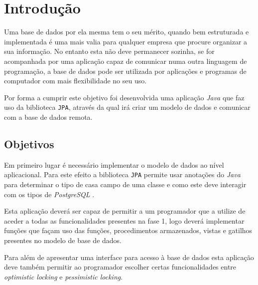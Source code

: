 %
%
\chapter{Introdução} \label{cap1}

Uma base de dados por ela mesma tem o seu mérito, quando bem estruturada e implementada é uma mais valia para qualquer empresa que procure organizar a sua informação. No entanto
esta não deve permanecer sozinha, se for acompanhada por uma aplicação capaz de comunicar numa outra linguagem de programação, a base de dados pode ser utilizada por aplicações
e programas de computador com mais flexibilidade no seu uso.

Por forma a cumprir este objetivo foi desenvolvida uma aplicação \textit{Java} que faz uso da biblioteca \texttt{JPA}, através da qual irá criar um modelo de dados e comunicar
com a base de dados remota.

%
%
\section{Objetivos} \label{sec11}

Em primeiro lugar é necessário implementar o modelo de dados ao nível aplicacional. Para este efeito a biblioteca \texttt{JPA} permite usar anotações do \textit{Java} para determinar
o tipo de casa campo de uma classe e como este deve interagir com os tipos de \textit{PostgreSQL} \cite{postgresql:docs}.

Esta aplicação deverá ser capaz de permitir a um programador que a utilize de aceder a todas as funcionalidades presentes na fase 1, logo deverá implementar funções que façam uso
das funções, procedimentos armazenados, vistas e gatilhos presentes no modelo de base de dados.

Para além de apresentar uma interface para acesso à base de dados esta aplicação deve também permitir ao programador escolher certas funcionalidades entre \textit{optimistic locking}
e \textit{pessimistic locking}.

